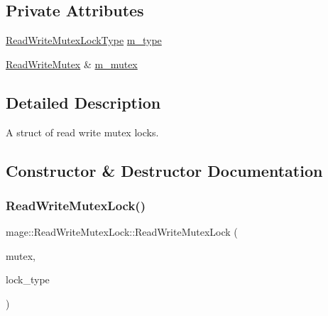 \subsection*{Private Attributes}
\begin{DoxyCompactItemize}
\item 
\hyperlink{namespacemage_afd76fcca37ce5c5b2227671290973c74}{Read\+Write\+Mutex\+Lock\+Type} \hyperlink{structmage_1_1_read_write_mutex_lock_aa117ffe94f6850ddc91ad6d1389fb6e2}{m\+\_\+type}
\item 
\hyperlink{structmage_1_1_read_write_mutex}{Read\+Write\+Mutex} \& \hyperlink{structmage_1_1_read_write_mutex_lock_a6ee9034fa984e11ec07c20ec77ab1bfe}{m\+\_\+mutex}
\end{DoxyCompactItemize}


\subsection{Detailed Description}
A struct of read write mutex locks. 

\subsection{Constructor \& Destructor Documentation}
\hypertarget{structmage_1_1_read_write_mutex_lock_a323e2f45646caa23c4ee21452c8f8d4a}{}\label{structmage_1_1_read_write_mutex_lock_a323e2f45646caa23c4ee21452c8f8d4a} 
\subsubsection{\texorpdfstring{Read\+Write\+Mutex\+Lock()}{ReadWriteMutexLock()}\hspace{0.1cm}{\footnotesize\ttfamily [1/3]}}
{\footnotesize\ttfamily mage\+::\+Read\+Write\+Mutex\+Lock\+::\+Read\+Write\+Mutex\+Lock (\begin{DoxyParamCaption}\item[{\hyperlink{structmage_1_1_read_write_mutex}{Read\+Write\+Mutex} \&}]{mutex,  }\item[{\hyperlink{namespacemage_afd76fcca37ce5c5b2227671290973c74}{Read\+Write\+Mutex\+Lock\+Type}}]{lock\+\_\+type }\end{DoxyParamCaption})\hspace{0.3cm}{\ttfamily [explicit]}}

